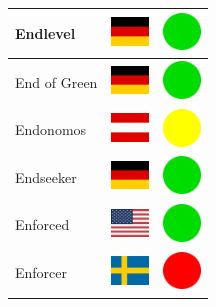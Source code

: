 \documentclass[12pt, a4paper, twoside]{report}
\begin{document}
\begin{center}
\begin{longtable}{|p{5cm}|p{2cm}|p{2cm}|}
 Endlevel                                                   & \includegraphics[width=1cm]{../img/flags/de} &   \includegraphics[width=1cm]{../likes/y} \\ \hline
 End of Green                                               & \includegraphics[width=1cm]{../img/flags/de} &   \includegraphics[width=1cm]{../likes/y} \\ \hline
 Endonomos                                                  & \includegraphics[width=1cm]{../img/flags/at} &   \includegraphics[width=1cm]{../likes/m} \\ \hline
 Endseeker                                                  & \includegraphics[width=1cm]{../img/flags/de} &   \includegraphics[width=1cm]{../likes/y} \\ \hline
 Enforced                                                   & \includegraphics[width=1cm]{../img/flags/us} &   \includegraphics[width=1cm]{../likes/y} \\ \hline
 Enforcer                                                   & \includegraphics[width=1cm]{../img/flags/se} &   \includegraphics[width=1cm]{../likes/n} \\ \hline

\end{longtable}
\end{center}
\end{document}
